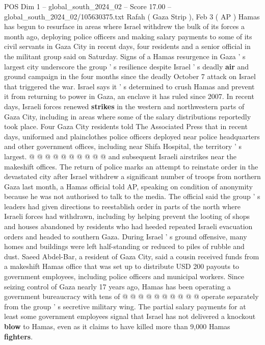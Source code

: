 \begin{textsample}{POS Dim 1 – global\_south\_2024\_02 – Score 17.00 – global\_south\_2024\_02/105630375.txt}  \label{ex:f1_pos_209}
Rafah ( Gaza Strip ), Feb 3 ( AP ) Hamas has begun to resurface in areas where Israel withdrew the bulk of its forces a month ago, deploying police officers and making salary payments to some of its civil servants in Gaza City in recent days, four residents and a senior official in the militant group said on Saturday.
Signs of a Hamas resurgence in Gaza ' s largest city underscore the group ' s resilience despite Israel ' s deadly \textbf{air} and ground campaign in the four months since the deadly October 7 attack on Israel that triggered the war.
Israel says it ' s determined to crush Hamas and prevent it from returning to power in Gaza, an enclave it has ruled since 2007.
In recent days, Israeli forces renewed \textbf{strikes} in the western and northwestern parts of Gaza City, including in areas where some of the salary distributions reportedly took place.
Four Gaza City residents told The Associated Press that in recent days, uniformed and plainclothes police officers deployed near police headquarters and other government offices, including near Shifa Hospital, the territory ' s largest. @ @ @ @ @ @ @ @ @ @ and subsequent Israeli airstrikes near the makeshift offices.
The return of police marks an attempt to reinstate order in the devastated city after Israel withdrew a significant number of troops from northern Gaza last month, a Hamas official told AP, speaking on condition of anonymity because he was not authorised to talk to the media.
The official said the group ' s leaders had given directions to reestablish order in parts of the north where Israeli forces had withdrawn, including by helping prevent the looting of shops and houses abandoned by residents who had heeded repeated Israeli evacuation orders and headed to southern Gaza.
During Israel ' s ground offensive, many homes and buildings were left half-standing or reduced to piles of rubble and dust.
Saeed Abdel-Bar, a resident of Gaza City, said a cousin received funds from a makeshift Hamas office that was set up to distribute USD 200 payouts to government employees, including police officers and municipal workers.
Since seizing control of Gaza nearly 17 years ago, Hamas has been operating a government bureaucracy with tens of @ @ @ @ @ @ @ @ @ @ operate separately from the group ' s secretive military wing.
The partial salary payments for at least some government employees signal that Israel has not delivered a knockout \textbf{blow} to Hamas, even as it claims to have killed more than 9,000 Hamas \textbf{fighters}.

\end{textsample}
